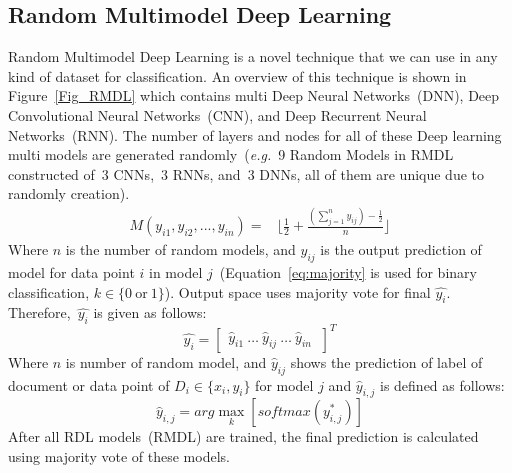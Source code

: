 \documentclass[sigconf, final]{acmart}
\begin{document}
\subsection{Random Multimodel Deep Learning}\label{subsect:RMDL}
Random Multimodel Deep Learning is a novel technique that we can use in any kind of dataset for classification. An overview of this technique is shown in Figure~\ref{Fig_RMDL} which contains multi Deep Neural Networks~(DNN), Deep Convolutional Neural Networks~(CNN), and Deep Recurrent Neural Networks~(RNN). The number of layers and nodes for all of these Deep learning multi models are generated randomly~(\textit{e.g.}~9 Random Models in RMDL constructed of~$3$ CNNs,~$3$ RNNs, and~$3$ DNNs, all of them are unique due to randomly creation). 
\begin{align}
\label{eq:majority}
M(y_{i1},y_{i2},...,y_{in}) =& \bigg\lfloor \frac{1}{2}+ \frac{(\sum_{j=1}^n y_{ij}) - \frac{1}{2}}{n}\bigg\rfloor%
\end{align}
Where $n$ is the number of random models, and $y_{ij}$ is the output prediction of model for data point $i$ in  model $j$~(Equation~\ref{eq:majority} is used for binary classification, $k\in\{0~ \text{or}~1\}$). Output space uses majority vote for final $\hat{y_i}$. Therefore,~$\hat{y_i}$ is given as follows:
\begin{equation}
\hat{y_i} =  
\begin{bmatrix}
\hat{y}_{i1} ~
\hdots ~
\hat{y}_{ij}~
\hdots~
\hat{y}_{in}~
\end{bmatrix}^T
\end{equation}Where $n$ is number of random model, and $\hat{y}_{ij}$ shows the prediction of label of document or data point of $D_i \in \{x_i,y_i\}$ for model $j$ and $\hat{y}_{i,j}$ is defined as follows:
\begin{equation}
\hat{y}_{i,j} = arg \max_{k} [ softmax(y_{i,j}^*)]
\end{equation}
After all RDL models~(RMDL) are trained, the final prediction is calculated using majority vote of these models. 
\end{document}
